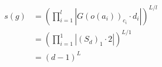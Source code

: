\documentclass[preview]{standalone}
\begin{document}
\begin{align*}
s(g) &= \left(\prod_{i=1}^{l}\left|G(o(a_i))_{c_i}\cdot d_i\right|\right)^{L/l} \\   &= \left(\prod_{i=1}^{1}\left|\left(S_d\right)_{1}\cdot 2\right|\right)^{L/1} \\   &= (d-1)^{L}
\end{align*}
\end{document}
